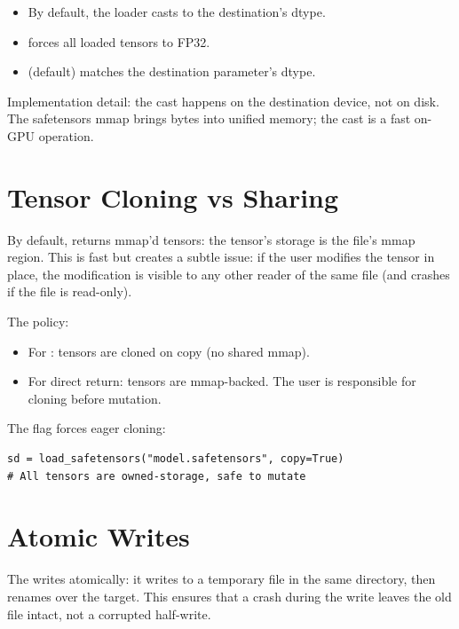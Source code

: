 \begin{itemize}
  \item By default, the loader casts to the destination's
    dtype.
  \item {}
    forces all loaded tensors to FP32.
  \item {} (default)
    matches the destination parameter's dtype.
\end{itemize}

Implementation detail: the cast happens on the destination
device, not on disk. The safetensors mmap brings bytes into
unified memory; the cast is a fast on-GPU operation.

\section{Tensor Cloning vs Sharing}
\label{sec:serialization:clone_vs_share}

By default,  returns mmap'd tensors:
the tensor's storage is the file's mmap region. This is fast
but creates a subtle issue: if the user modifies the tensor in
place, the modification is visible to any other reader of the
same file (and crashes if the file is read-only).

The policy:
\begin{itemize}
  \item For : tensors are cloned
    on copy (no shared mmap).
  \item For direct  return: tensors
    are mmap-backed. The user is responsible for cloning
    before mutation.
\end{itemize}

The  flag forces eager cloning:

\begin{lstlisting}[style=lucid,language=LucidPython]
sd = load_safetensors("model.safetensors", copy=True)
# All tensors are owned-storage, safe to mutate
\end{lstlisting}

\section{Atomic Writes}
\label{sec:serialization:atomic_writes}

The  writes atomically: it writes to a
temporary file in the same directory, then renames over the
target. This ensures that a crash during the write leaves the
old file intact, not a corrupted half-write.

